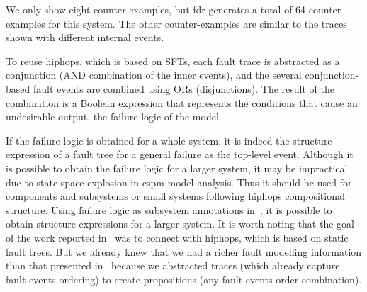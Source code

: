 \documentclass[en,twoside,onehalfspacing,phd]{risethesis}
\begin{document}
We only show eight counter-examples, but \acs{fdr} generates a total of 64 counter-examples for this system.
The other counter-examples are similar to the traces shown with different internal events.

To reuse \ac{hiphops}, which is based on \acp{SFT}, each fault trace is abstracted as a conjunction (AND combination of the inner events), and the several conjunction-based fault events are combined using ORs (disjunctions).
%
The result of the combination is a Boolean expression that represents the conditions that cause an undesirable output, the failure logic of the model.

If the failure logic is obtained for a whole system, it is indeed the structure expression of a fault tree for a general failure as the top-level event.
Although it is possible to obtain the failure logic for a larger system, it may be impractical due to state-space explosion in \ac{cspm} model analysis.
Thus it should be used for components and subsystems or small systems following \ac{hiphops} compositional structure.
%
Using failure logic as subsystem annotations in~\cite{PMS+2001}, it is possible to obtain structure expressions for a larger system.
It is worth noting that the goal of the work reported in~\cite{DM2012} was to connect with \ac{hiphops}, which is based on static fault trees.
But we already knew that we had a richer fault modelling information than that presented in~\cite{DM2012} because we abstracted traces (which already capture fault events ordering) to create propositions (any fault events order combination).

\end{document}
